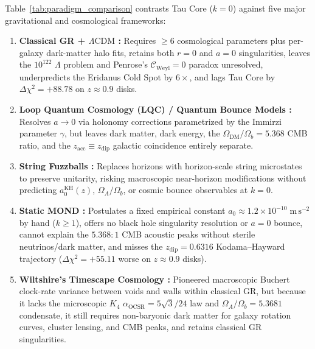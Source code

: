 \documentclass[11pt,a4paper]{article}
\theoremstyle{remark}
\begin{document}
Table~\ref{tab:paradigm_comparison} contrasts Tau Core ($k = 0$) against five major gravitational and cosmological frameworks:
\begin{enumerate}
  \item \textbf{Classical GR + $\Lambda\mathrm{CDM}$ \cite{HawkingEllis1973,Planck2018VI}:} Requires $\ge 6$ cosmological parameters plus per-galaxy dark-matter halo fits, retains both $r = 0$ and $a = 0$ singularities, leaves the $10^{122}$ $\Lambda$ problem and Penrose's $\mathcal{C}_{\mathrm{Weyl}} = 0$ paradox unresolved, underpredicts the Eridanus Cold Spot by $6\times$, and lags Tau Core by $\Delta\chi^2 = +88.78$ on $z \approx 0.9$ disks.
  \item \textbf{Loop Quantum Cosmology (LQC) / Quantum Bounce Models \cite{Ashtekar2006LQC}:} Resolves $a \to 0$ via holonomy corrections parametrized by the Immirzi parameter $\gamma$, but leaves dark matter, dark energy, the $\Omega_{\mathrm{DM}}/\Omega_b = 5.368$ CMB ratio, and the $z_{\mathrm{acc}} \equiv z_{\mathrm{dip}}$ galactic coincidence entirely separate.
  \item \textbf{String Fuzzballs \cite{Mathur2005Fuzzball}:} Replaces horizons with horizon-scale string microstates to preserve unitarity, risking macroscopic near-horizon modifications without predicting $a_0^{\mathrm{KH}}(z)$, $\Omega_A/\Omega_b$, or cosmic bounce observables at $k = 0$.
  \item \textbf{Static MOND \cite{Milgrom1983}:} Postulates a fixed empirical constant $a_0 \approx 1.2 \times 10^{-10}\;\mathrm{m\,s^{-2}}$ by hand ($k \ge 1$), offers no black hole singularity resolution or $a = 0$ bounce, cannot explain the $5.368:1$ CMB acoustic peaks without sterile neutrinos/dark matter, and misses the $z_{\mathrm{dip}} = 0.6316$ Kodama--Hayward trajectory ($\Delta\chi^2 = +55.11$ worse on $z \approx 0.9$ disks).
  \item \textbf{Wiltshire's Timescape Cosmology \cite{Wiltshire2007Timescape}:} Pioneered macroscopic Buchert clock-rate variance between voids and walls within classical GR, but because it lacks the microscopic $K_4$ $\alpha_{\mathrm{OCSR}} = 5\sqrt{3}/24$ law and $\Omega_A/\Omega_b = 5.3681$ condensate, it still requires non-baryonic dark matter for galaxy rotation curves, cluster lensing, and CMB peaks, and retains classical GR singularities.
\end{enumerate}
\end{document}
